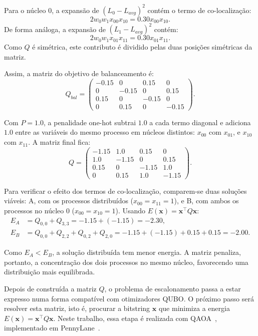 Para o núcleo $0$, a expansão de $(L_0 - L_{avg})^2$ contém o termo de
co-localização:
\[
2w_0w_1x_{00}x_{10}=0.30x_{00}x_{10}.
\]
De forma análoga, a expansão de $(L_1 - L_{avg})^2$ contém:
\[
2w_0w_1x_{01}x_{11}=0.30x_{01}x_{11}.
\]
Como $Q$ é simétrica, este contributo é dividido pelas duas posições simétricas da matriz.

Assim, a matriz do objetivo de balanceamento é:
\begin{equation}
Q_{bal} =
\begin{pmatrix}
-0.15 & 0 & 0.15 & 0 \\
0 & -0.15 & 0 & 0.15 \\
0.15 & 0 & -0.15 & 0 \\
0 & 0.15 & 0 & -0.15
\end{pmatrix}.
\end{equation}

Com $P=1.0$, a penalidade one-hot subtrai $1.0$ a cada termo diagonal e adiciona $1.0$
entre as variáveis do mesmo processo em núcleos distintos: $x_{00}$ com $x_{01}$, e
$x_{10}$ com $x_{11}$. A matriz final fica:
\begin{equation}
Q =
\begin{pmatrix}
-1.15 & 1.0 & 0.15 & 0 \\
1.0 & -1.15 & 0 & 0.15 \\
0.15 & 0 & -1.15 & 1.0 \\
0 & 0.15 & 1.0 & -1.15
\end{pmatrix}.
\end{equation}

Para verificar o efeito dos termos de co-localização, comparem-se duas soluções viáveis:
A, com os processos distribuídos ($x_{00}=x_{11}=1$), e B, com ambos os processos no
núcleo $0$ ($x_{00}=x_{10}=1$). Usando $E(\mathbf{x})=\mathbf{x}^{\top}Q\mathbf{x}$:
\begin{equation}
\begin{aligned}
E_A &= Q_{0,0} + Q_{3,3}
= -1.15 + (-1.15)
= \mathbf{-2.30},\\
E_B &= Q_{0,0} + Q_{2,2} + Q_{0,2} + Q_{2,0}
= -1.15 + (-1.15) + 0.15 + 0.15
= \mathbf{-2.00}.
\end{aligned}
\end{equation}

Como $E_A < E_B$, a solução distribuída tem menor energia. A matriz penaliza, portanto,
a concentração dos dois processos no mesmo núcleo, favorecendo uma distribuição mais
equilibrada.

Depois de construída a matriz $Q$, o problema de escalonamento passa a estar expresso
numa forma compatível com otimizadores \acs{QUBO}. O próximo passo será resolver esta matriz, isto é, procurar a bitstring $\mathbf{x}$ que minimiza a energia $E(\mathbf{x})=\mathbf{x}^{\top}Q\mathbf{x}$. Neste trabalho, essa etapa é realizada
com \acs{QAOA}~\cite{Farhi2014QAOA}, implementado em PennyLane~\cite{Bergholm2018PennyLane}.
